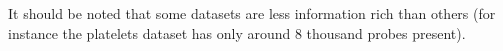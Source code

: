 \documentclass[11pt]{article} %
\begin{document}
	It should be noted that some datasets are less information rich than others (for instance the platelets dataset has only around 8 thousand probes present). 
	
%	
%	
%	
	
	
\end{document}
